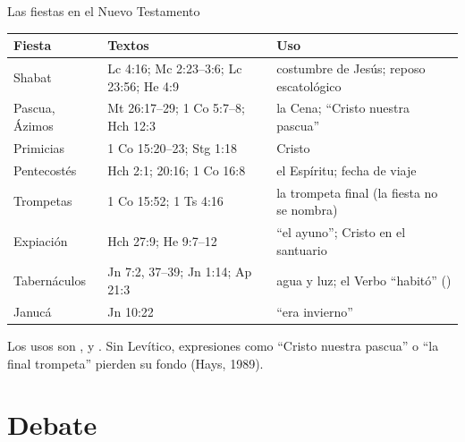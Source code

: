 \begin{frame}{Las fiestas en el Nuevo Testamento}
\scriptsize\renewcommand{\arraystretch}{1.08}
\begin{tabular}{@{}L{2.2cm}L{4.4cm}L{5.2cm}@{}}
\toprule
\textbf{Fiesta} & \textbf{Textos} & \textbf{Uso} \\ \midrule
Shabat & Lc 4:16; Mc 2:23--3:6; Lc 23:56; He 4:9 & costumbre de Jesús; reposo escatológico \\
Pascua, Ázimos & Mt 26:17--29; 1 Co 5:7--8; Hch 12:3 & la Cena; ``Cristo nuestra pascua'' \\
Primicias & 1 Co 15:20--23; Stg 1:18 & Cristo  \\
Pentecostés & Hch 2:1; 20:16; 1 Co 16:8 & el Espíritu; fecha de viaje \\
Trompetas & 1 Co 15:52; 1 Ts 4:16 & la trompeta final (la fiesta no se nombra) \\
Expiación & Hch 27:9; He 9:7--12 & ``el ayuno''; Cristo en el santuario \\
Tabernáculos & Jn 7:2, 37--39; Jn 1:14; Ap 21:3 & agua y luz; el Verbo ``habitó'' () \\
Janucá & Jn 10:22 & ``era invierno'' \\
\bottomrule
\end{tabular}\par\smallskip
\small Los usos son ,  y . Sin Levítico, expresiones como ``Cristo nuestra pascua'' o ``la final trompeta'' pierden su fondo (Hays, 1989).
\end{frame}

\section{Debate}

